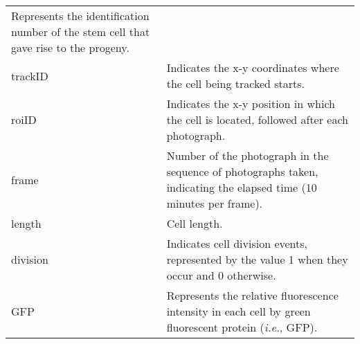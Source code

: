\documentclass[
  12pt,
  a4paper,
  oneside]{krantz}
\begin{document}
\begin{longtable}[]{@{}ll@{}}
\begin{minipage}[t]{0.61\columnwidth}
Represents the identification number of the stem cell that gave
rise to the progeny.\strut
\end{minipage}\tabularnewline
\begin{minipage}[t]{0.33\columnwidth}\raggedright
trackID\strut
\end{minipage} & \begin{minipage}[t]{0.61\columnwidth}\raggedright
Indicates the x-y coordinates where the cell being tracked
starts.\strut
\end{minipage}\tabularnewline
\begin{minipage}[t]{0.33\columnwidth}\raggedright
roiID\strut
\end{minipage} & \begin{minipage}[t]{0.61\columnwidth}\raggedright
Indicates the x-y position in which the cell is located,
followed after each photograph.\strut
\end{minipage}\tabularnewline
\begin{minipage}[t]{0.33\columnwidth}\raggedright
frame\strut
\end{minipage} & \begin{minipage}[t]{0.61\columnwidth}\raggedright
Number of the photograph in the sequence of photographs taken,
indicating the elapsed time (10 minutes per frame).\strut
\end{minipage}\tabularnewline
\begin{minipage}[t]{0.33\columnwidth}\raggedright
length\strut
\end{minipage} & \begin{minipage}[t]{0.61\columnwidth}\raggedright
Cell length.\strut
\end{minipage}\tabularnewline
\begin{minipage}[t]{0.33\columnwidth}\raggedright
division\strut
\end{minipage} & \begin{minipage}[t]{0.61\columnwidth}\raggedright
Indicates cell division events, represented by the value 1 when
they occur and 0 otherwise.\strut
\end{minipage}\tabularnewline
\begin{minipage}[t]{0.33\columnwidth}\raggedright
GFP\strut
\end{minipage} & \begin{minipage}[t]{0.61\columnwidth}\raggedright
Represents the relative fluorescence intensity in each cell by
green fluorescent protein (\emph{i.e.}, GFP).\strut
\end{minipage}\tabularnewline

\end{longtable}
\end{document}
